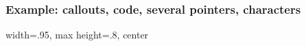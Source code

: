 %

\begin{frame}
    \frametitle{Example: callouts, code, several pointers, characters}

    \begin{adjustbox}{width=.95\linewidth, max height=.8\textheight, center}
        
    \end{adjustbox}

\end{frame}

